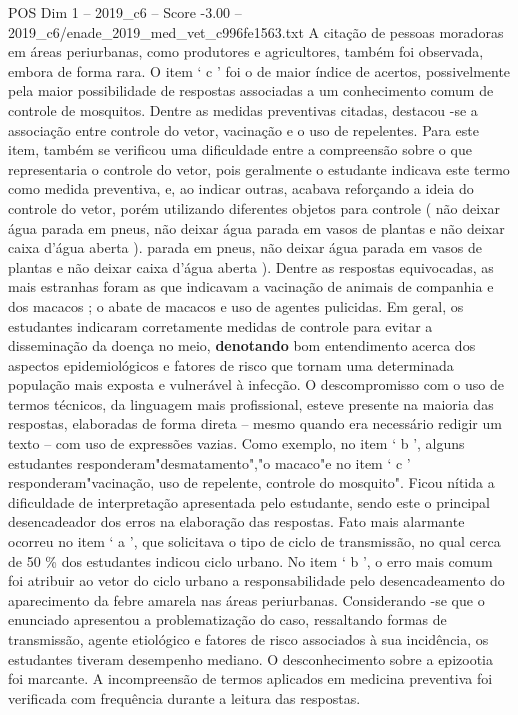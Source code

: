 \begin{textsample}{POS Dim 1 – 2019\_c6 – Score -3.00 – 2019\_c6/enade\_2019\_med\_vet\_c996fe1563.txt}
A citação de pessoas moradoras em áreas periurbanas, como produtores e agricultores, também foi observada, embora de forma rara.
O item ‘ c ’ foi o de maior índice de acertos, possivelmente pela maior possibilidade de respostas associadas a um conhecimento comum de controle de mosquitos.
Dentre as medidas preventivas citadas, destacou -se a associação entre controle do vetor, vacinação e o uso de repelentes.
Para este item, também se verificou uma dificuldade entre a compreensão sobre o que representaria o controle do vetor, pois geralmente o estudante indicava este termo como medida preventiva, e, ao indicar outras, acabava reforçando a ideia do controle do vetor, porém utilizando diferentes objetos para controle ( não deixar água parada em pneus, não deixar água parada em vasos de plantas e não deixar caixa d’água aberta ). parada em pneus, não deixar água parada em vasos de plantas e não deixar caixa d’água aberta ).
Dentre as respostas equivocadas, as mais estranhas foram as que indicavam a vacinação de animais de companhia e dos macacos ; o abate de macacos e uso de agentes pulicidas.
Em geral, os estudantes indicaram corretamente medidas de controle para evitar a disseminação da doença no meio, \textbf{denotando} bom entendimento acerca dos aspectos epidemiológicos e fatores de risco que tornam uma determinada população mais exposta e vulnerável à infecção.
O descompromisso com o uso de termos técnicos, da linguagem mais profissional, esteve presente na maioria das respostas, elaboradas de forma direta – mesmo quando era necessário redigir um texto – com uso de expressões vazias.
Como exemplo, no item ‘ b ’, alguns estudantes responderam"desmatamento","o macaco"e no item ‘ c ’ responderam"vacinação, uso de repelente, controle do mosquito".
Ficou nítida a dificuldade de interpretação apresentada pelo estudante, sendo este o principal desencadeador dos erros na elaboração das respostas.
Fato mais alarmante ocorreu no item ‘ a ’, que solicitava o tipo de ciclo de transmissão, no qual cerca de 50 \% dos estudantes indicou ciclo urbano.
No item ‘ b ’, o erro mais comum foi atribuir ao vetor do ciclo urbano a responsabilidade pelo desencadeamento do aparecimento da febre amarela nas áreas periurbanas.
Considerando -se que o enunciado apresentou a problematização do caso, ressaltando formas de transmissão, agente etiológico e fatores de risco associados à sua incidência, os estudantes tiveram desempenho mediano.
O desconhecimento sobre a epizootia foi marcante.
A incompreensão de termos aplicados em medicina preventiva foi verificada com frequência durante a leitura das respostas.

\end{textsample}
